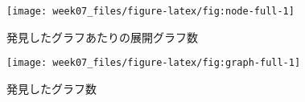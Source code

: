\documentclass[xelatex,ja=standard,11pt]{bxjsarticle}
\begin{document}
\begin{figure}

{\centering \texttt{[image: week07\_files/figure-latex/fig:node-full-1]} 

}

\caption{発見したグラフあたりの展開グラフ数}\label{fig:fig:node-full}
\end{figure}

\begin{figure}

{\centering \texttt{[image: week07\_files/figure-latex/fig:graph-full-1]} 

}

\caption{発見したグラフ数}\label{fig:fig:graph-full}
\end{figure}
\end{document}
